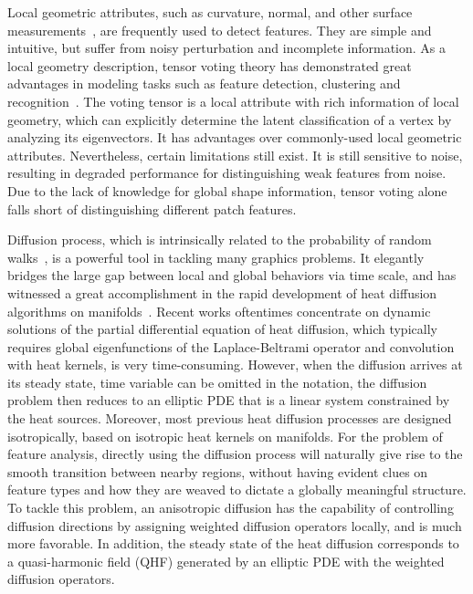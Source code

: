 \documentclass[10pt,journal,cspaper,compsoc]{IEEEtran}
\begin{document}
Local geometric attributes, such as curvature, normal, and other
surface measurements~\cite{MDSB02}, are frequently used to detect
features. They are simple and intuitive, but suffer from noisy
perturbation and incomplete information. As a local geometry
description, tensor voting theory has demonstrated great advantages in
modeling tasks such as feature detection, clustering and
recognition~\cite{GM00,PSKP*02,LDB05,KCL09}. The voting tensor is a
local attribute with rich information of local geometry, which can
explicitly determine the latent classification of a vertex by
analyzing its eigenvectors. It has advantages over commonly-used local
geometric attributes. Nevertheless, certain limitations still exist.
It is still sensitive to noise, resulting in degraded performance for
distinguishing weak features from noise. Due to the lack of knowledge
for global shape information, tensor voting alone falls short of
distinguishing different patch features.

Diffusion process, which is intrinsically related to the probability
of random walks~\cite{LHMR09,ZZC11}, is a powerful tool in tackling
many graphics problems. It elegantly bridges the large gap between
local and global behaviors via time scale, and has witnessed a great
accomplishment in the rapid development of heat diffusion algorithms
on manifolds~\cite{DMSB99,UUM00,SOG09,SMH10}. Recent works oftentimes
concentrate on dynamic solutions of the partial differential equation
of heat diffusion, which typically requires global eigenfunctions of
the Laplace-Beltrami operator and convolution with heat kernels, is
very time-consuming. However, when the diffusion arrives at its steady
state, time variable can be omitted in the notation, the diffusion
problem then reduces to an elliptic PDE that is a linear system
constrained by the heat sources. Moreover, most previous heat
diffusion processes are designed isotropically, based on isotropic
heat kernels on manifolds. For the problem of feature analysis,
directly using the diffusion process will naturally give rise to the
smooth transition between nearby regions, without having evident clues
on feature types and how they are weaved to dictate a globally
meaningful structure. To tackle this problem, an anisotropic diffusion
has the capability of controlling diffusion directions by assigning
weighted diffusion operators locally, and is much more favorable. In
addition, the steady state of the heat diffusion corresponds to a
quasi-harmonic field (QHF) generated by an elliptic PDE with the
weighted diffusion operators.
\end{document}
